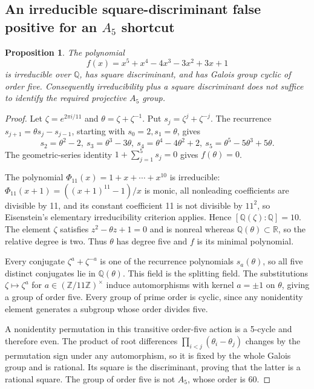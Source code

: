 \documentclass[11pt]{article}
\newtheorem{proposition}{Proposition}
\begin{document}
\subsection{An irreducible square-discriminant false positive for an $A_5$ shortcut}
\begin{proposition}
The polynomial
\[
 f(x)=x^5+x^4-4x^3-3x^2+3x+1
\]
is irreducible over $\mathbb Q$, has square discriminant, and has Galois group cyclic of order five. Consequently irreducibility plus a square discriminant does not suffice to identify the required projective $A_5$ group.
\end{proposition}
\begin{proof}
Let $\zeta=e^{2\pi i/11}$ and $\theta=\zeta+\zeta^{-1}$. Put $s_j=\zeta^j+\zeta^{-j}$. The recurrence $s_{j+1}=\theta s_j-s_{j-1}$, starting with $s_0=2,s_1=\theta$, gives
\[
 s_2=\theta^2-2,\ s_3=\theta^3-3\theta,\ s_4=\theta^4-4\theta^2+2,\ s_5=\theta^5-5\theta^3+5\theta.
\]
The geometric-series identity $1+\sum_{j=1}^5s_j=0$ gives $f(\theta)=0$.

The polynomial $\Phi_{11}(x)=1+x+\cdots+x^{10}$ is irreducible: $\Phi_{11}(x+1)=((x+1)^{11}-1)/x$ is monic, all nonleading coefficients are divisible by 11, and its constant coefficient 11 is not divisible by $11^2$, so Eisenstein's elementary irreducibility criterion applies. Hence $[\mathbb Q(\zeta):\mathbb Q]=10$. The element $\zeta$ satisfies $z^2-\theta z+1=0$ and is nonreal whereas $\mathbb Q(\theta)\subset\mathbb R$, so the relative degree is two. Thus $\theta$ has degree five and $f$ is its minimal polynomial.

Every conjugate $\zeta^a+\zeta^{-a}$ is one of the recurrence polynomials $s_a(\theta)$, so all five distinct conjugates lie in $\mathbb Q(\theta)$. This field is the splitting field. The substitutions $\zeta\mapsto\zeta^a$ for $a\in(\mathbb Z/11\mathbb Z)^\times$ induce automorphisms with kernel $a=\pm1$ on $\theta$, giving a group of order five. Every group of prime order is cyclic, since any nonidentity element generates a subgroup whose order divides five.

A nonidentity permutation in this transitive order-five action is a 5-cycle and therefore even. The product of root differences $\prod_{i<j}(\theta_i-\theta_j)$ changes by the permutation sign under any automorphism, so it is fixed by the whole Galois group and is rational. Its square is the discriminant, proving that the latter is a rational square. The group of order five is not $A_5$, whose order is 60.
\end{proof}
\end{document}
